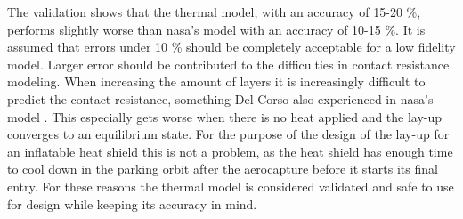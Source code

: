 The validation shows that the thermal model, with an accuracy of 15-20 \%, performs slightly worse than \gls{nasa}'s model with an accuracy of 10-15 \%. It is assumed that errors under 10 \% should be completely acceptable for a low fidelity model. Larger error should be contributed to the difficulties in contact resistance modeling. When increasing the amount of layers it is increasingly difficult to predict the contact resistance, something Del Corso also experienced in \gls{nasa}'s model \cite{Corso2009}. This especially gets worse when there is no heat applied and the lay-up converges to an equilibrium state. For the purpose of the design of the lay-up for an inflatable heat shield this is not a problem, as the heat shield has enough time to cool down in the parking orbit after the aerocapture before it starts its final entry. For these reasons the thermal model is considered validated and safe to use for design while keeping its accuracy in mind.